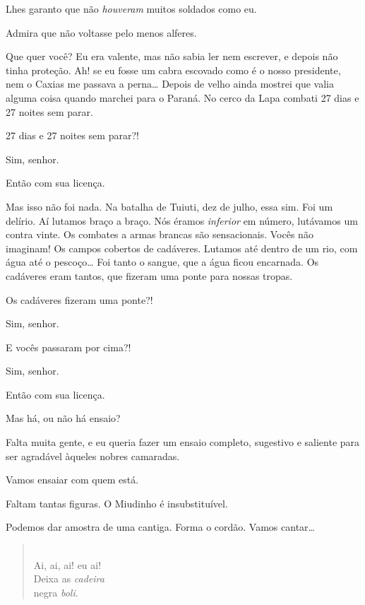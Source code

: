  Lhes garanto que não \textit{houveram} muitos soldados como
eu.

 Admira que não voltasse pelo menos alferes.

 Que quer você? Eu era valente, mas não
sabia ler nem escrever, e depois não tinha proteção. Ah! se eu fosse um cabra
escovado como é o nosso presidente, nem o Caxias me passava a perna\ldots{} Depois de
velho ainda mostrei que valia alguma coisa quando marchei para o Paraná. No
cerco da Lapa combati 27 dias e 27 noites sem parar.

 27 dias e 27 noites sem parar?!

 Sim, senhor.

 Então com sua licença.  

 Mas isso não foi nada. Na batalha de Tuiuti, dez de julho,
essa sim. Foi um delírio. Aí lutamos braço a braço. Nós éramos \textit{inferior}
em número, lutávamos um contra vinte. Os combates a armas brancas são
sensacionais. Vocês não imaginam! Os campos cobertos de cadáveres. Lutamos até
dentro de um rio, com água até o pescoço\ldots{} Foi tanto o sangue, que a água ficou
encarnada. Os cadáveres eram tantos, que fizeram uma ponte para nossas tropas.

 Os cadáveres fizeram uma ponte?!

 Sim, senhor.

 E vocês passaram por cima?!

 Sim, senhor.

 Então com sua licença.  

 Mas há, ou não há ensaio?

 Falta muita gente, e eu queria fazer um ensaio completo,
sugestivo e saliente para ser agradável àqueles nobres camaradas.

 Vamos ensaiar com quem está.

 Faltam tantas figuras. O Miudinho é insubstituível.

 Podemos dar amostra de uma cantiga. Forma o cordão.
Vamos cantar\ldots{}

\begin{verse}
 \\
Ai, ai, ai! eu ai!\\
Deixa as \textit{cadeira}\\
negra \textit{boli}.
\end{verse}

